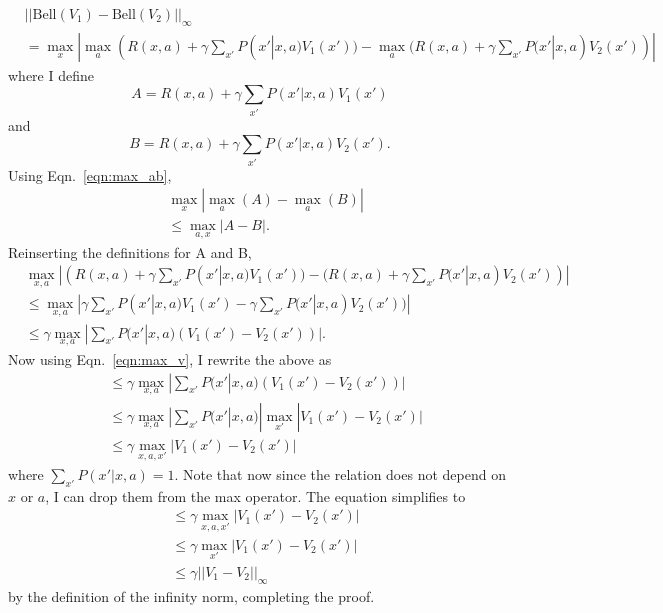 \documentclass[12pt]{amsart}
\begin{document}
\begin{equation}
\begin{split}
& ||\text{Bell}(V_1) - \text{Bell}(V_2)||_{\infty} \\
& = \max_{x} | \max_a (R(x,a) + \gamma \sum_{x'}P(x'|x,a)V_1(x')) - \max_a (R(x,a) + \gamma \sum_{x'}P(x'|x,a)V_2(x'))|
\end{split}
\end{equation}
where I define 
\begin{equation}
A = R(x,a) + \gamma \sum_{x'}P(x'|x,a)V_1(x')
\end{equation}
and 
\begin{equation}
B = R(x,a) + \gamma \sum_{x'}P(x'|x,a)V_2(x').
\end{equation}
Using Eqn.~\ref{eqn:max_ab},
\begin{equation}
\begin{split}
& \max_x | \max_a(A) - \max_a(B) | \\
& \leq \max_{a,x} |A - B|.
\end{split}
\end{equation}
Reinserting the definitions for A and B,
\begin{equation}
\begin{split}
&\max_{x,a} |(R(x,a) + \gamma \sum_{x'}P(x'|x,a)V_1(x')) - (R(x,a) + \gamma \sum_{x'}P(x'|x,a)V_2(x'))| \\
&\leq \max_{x,a} | \gamma \sum_{x'}P(x'|x,a)V_1(x') - \gamma \sum_{x'}P(x'|x,a)V_2(x'))| \\
& \leq  \gamma \max_{x,a} |\sum_{x'}P(x'|x,a)(V_1(x') - V_2(x'))|.
\end{split}
\end{equation}
Now using Eqn.~\ref{eqn:max_v}, I rewrite the above as
\begin{equation}
\begin{split}
& \leq  \gamma \max_{x,a} |\sum_{x'}P(x'|x,a)(V_1(x') - V_2(x'))| \\
& \leq \gamma \max_{x,a} |\sum_{x'}P(x'|x,a)| \max_{x'}|V_1(x') - V_2(x')| \\
& \leq \gamma \max_{x,a,x'}|V_1(x') - V_2(x')|
\end{split}
\end{equation}
where $\sum_{x'}P(x'|x,a) = 1$.  Note that now since the relation does not depend on $x$ or $a$, I can drop them from the max operator.  The equation simplifies to 
\begin{equation}
\begin{split}
& \leq \gamma \max_{x,a,x'}|V_1(x') - V_2(x')| \\
& \leq \gamma \max_{x'}|V_1(x') - V_2(x')| \\
& \leq \gamma ||V_1 - V_2||_{\infty}
\end{split}
\end{equation}
by the definition of the infinity norm, completing the proof.
\end{document}
